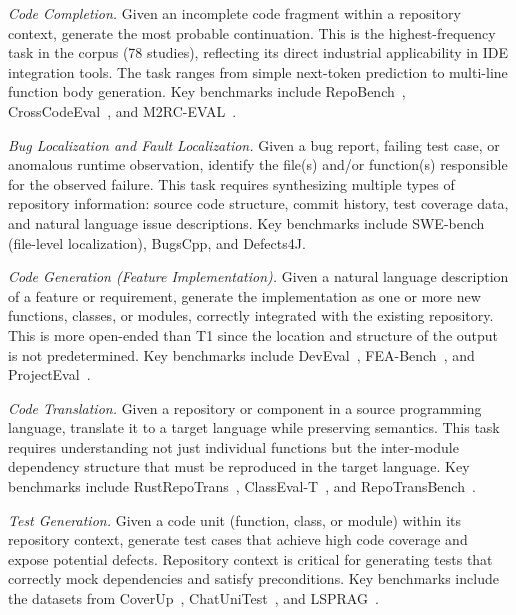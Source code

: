 \begin{description}[leftmargin=2.5em, labelwidth=2.5em]

\item[\textbf{T1:}] \textit{Code Completion.} Given an incomplete code fragment within a
  repository context, generate the most probable continuation. This is the highest-frequency
  task in the corpus (78 studies), reflecting its direct industrial applicability in IDE
  integration tools. The task ranges from simple next-token prediction to multi-line function
  body generation. Key benchmarks include RepoBench~\cite{liu2024repobench},
  CrossCodeEval~\cite{ding2023crosscodeeval}, and M2RC-EVAL~\cite{liu2025m2rceval}.

\item[\textbf{T2:}] \textit{Bug Localization and Fault Localization.} Given a bug report,
  failing test case, or anomalous runtime observation, identify the file(s) and/or function(s)
  responsible for the observed failure. This task requires synthesizing multiple types of
  repository information: source code structure, commit history, test coverage data, and
  natural language issue descriptions. Key benchmarks include SWE-bench~\cite{jimenez2024swebench}
  (file-level localization), BugsCpp, and Defects4J.

\item[\textbf{T3:}] \textit{Code Generation (Feature Implementation).} Given a natural language
  description of a feature or requirement, generate the implementation as one or more new
  functions, classes, or modules, correctly integrated with the existing repository. This is
  more open-ended than T1 since the location and structure of the output is not predetermined.
  Key benchmarks include DevEval~\cite{li2024deveval}, FEA-Bench~\cite{li2025feabench},
  and ProjectEval~\cite{liu2025projecteval}.

\item[\textbf{T4:}] \textit{Code Translation.} Given a repository or component in a source
  programming language, translate it to a target language while preserving semantics. This
  task requires understanding not just individual functions but the inter-module dependency
  structure that must be reproduced in the target language. Key benchmarks include
  RustRepoTrans~\cite{ou2025rustrepo}, ClassEval-T~\cite{xue2025classevalt}, and
  RepoTransBench~\cite{wang2026repotransbench}.

\item[\textbf{T5:}] \textit{Test Generation.} Given a code unit (function, class, or module)
  within its repository context, generate test cases that achieve high code coverage and
  expose potential defects. Repository context is critical for generating tests that correctly
  mock dependencies and satisfy preconditions. Key benchmarks include the datasets from
  CoverUp~\cite{altmayer2025coverup}, ChatUniTest~\cite{chen2024chatunittest}, and
  LSPRAG~\cite{go2025lsprag}.


\end{description}
